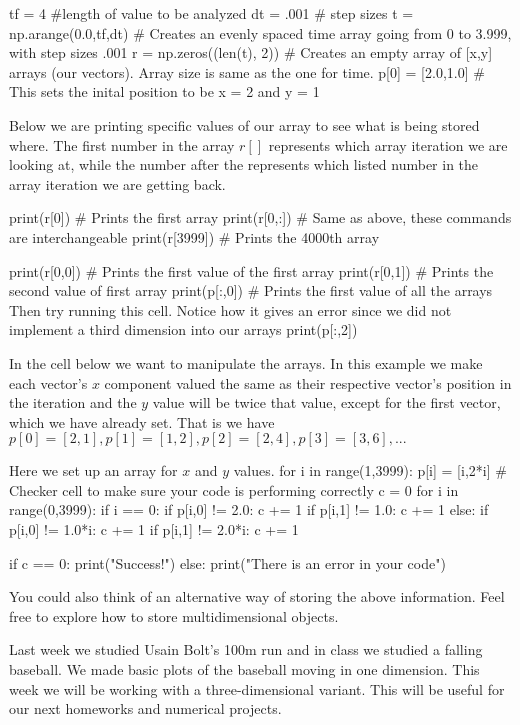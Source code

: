 \documentclass[%
oneside,                 %
final,                   %
10pt]{article}
\begin{document}
\bpycod
tf = 4 #length of value to be analyzed
dt = .001 # step sizes
t = np.arange(0.0,tf,dt) # Creates an evenly spaced time array going from 0 to 3.999, with step sizes .001
r = np.zeros((len(t), 2)) # Creates an empty array of [x,y] arrays (our vectors). Array size is same as the one for time.
p[0] = [2.0,1.0] # This sets the inital position to be x = 2 and y = 1
\epycod

Below we are printing specific values of our array to see what is being
stored where. The first number in the array $r[]$ represents which array
iteration we are looking at, while the number after the  represents
which listed number in the array iteration we are getting back. 


\bpycod
print(r[0]) # Prints the first array
print(r[0,:]) # Same as above, these commands are interchangeable 
\epycod
\bpycod
print(r[3999]) # Prints the 4000th array
\epycod

\bpycod
print(r[0,0]) # Prints the first value of the first array
\epycod
\bpycod
print(r[0,1]) # Prints the second value of first array
print(p[:,0]) # Prints the first value of all the arrays
\epycod
Then try running this cell. Notice how it gives an error since we did not implement a third dimension into our arrays
\bpycod
print(p[:,2])
\epycod

In the cell below we want to manipulate the arrays.
In this example we make each vector's $x$ component valued the same as their respective vector's position in the iteration and the $y$ value will be twice that value, except for  the first vector, which we have already set. 
That is we have $p[0] = [2,1], p[1] = [1,2], p[2] = [2,4], p[3] = [3,6], ...$

Here we set up an array for $x$ and $y$ values. 
\bpycod
for i in range(1,3999):
    p[i] = [i,2*i]
# Checker cell to make sure your code is performing correctly
c = 0
for i in range(0,3999):
    if i == 0:
        if p[i,0] != 2.0:
            c += 1
        if p[i,1] != 1.0:
            c += 1
    else:
        if p[i,0] != 1.0*i:
            c += 1
        if p[i,1] != 2.0*i:
            c += 1

if c == 0:
    print("Success!")
else:
    print("There is an error in your code")
\epycod

You could also think of an alternative way of storing the above information. Feel free to explore how to store
multidimensional objects. 


Last week we studied Usain Bolt's 100m run and in class we studied a falling baseball. We made basic plots of the baseball
moving in one dimension. This week we will be working with a three-dimensional variant. This will be useful for our next homeworks and numerical projects. 
\end{document}
